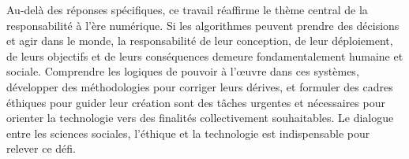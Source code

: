 \documentclass[10pt, twocolumn]{article}
\begin{document}
Au-delà des réponses spécifiques, ce travail réaffirme le thème central de la responsabilité à l'ère numérique. Si les algorithmes peuvent prendre des décisions et agir dans le monde, la responsabilité de leur conception, de leur déploiement, de leurs objectifs et de leurs conséquences demeure fondamentalement humaine et sociale. Comprendre les logiques de pouvoir à l'œuvre dans ces systèmes, développer des méthodologies pour corriger leurs dérives, et formuler des cadres éthiques pour guider leur création sont des tâches urgentes et nécessaires pour orienter la technologie vers des finalités collectivement souhaitables. Le dialogue entre les sciences sociales, l'éthique et la technologie est indispensable pour relever ce défi.

\newpage


\end{document}
